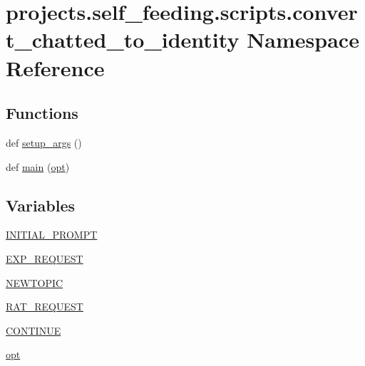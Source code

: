 \hypertarget{namespaceprojects_1_1self__feeding_1_1scripts_1_1convert__chatted__to__identity}{}\section{projects.\+self\+\_\+feeding.\+scripts.\+convert\+\_\+chatted\+\_\+to\+\_\+identity Namespace Reference}
\label{namespaceprojects_1_1self__feeding_1_1scripts_1_1convert__chatted__to__identity}
\subsection*{Functions}
\begin{DoxyCompactItemize}
\item 
def \hyperlink{namespaceprojects_1_1self__feeding_1_1scripts_1_1convert__chatted__to__identity_a2179caf1a41e96bb38cad058863084a3}{setup\+\_\+args} ()
\item 
def \hyperlink{namespaceprojects_1_1self__feeding_1_1scripts_1_1convert__chatted__to__identity_ac409d1c26364c39762dd2357afdaf64a}{main} (\hyperlink{namespaceprojects_1_1self__feeding_1_1scripts_1_1convert__chatted__to__identity_a20c8e6a1edf5dd1186afbb0f961f288f}{opt})
\end{DoxyCompactItemize}
\subsection*{Variables}
\begin{DoxyCompactItemize}
\item 
\hyperlink{namespaceprojects_1_1self__feeding_1_1scripts_1_1convert__chatted__to__identity_a59ec78cd0ffcde2e03b3d3c052e57451}{I\+N\+I\+T\+I\+A\+L\+\_\+\+P\+R\+O\+M\+PT}
\item 
\hyperlink{namespaceprojects_1_1self__feeding_1_1scripts_1_1convert__chatted__to__identity_a2273b0a6ff3e82c4ac1d94a7f03e43ee}{E\+X\+P\+\_\+\+R\+E\+Q\+U\+E\+ST}
\item 
\hyperlink{namespaceprojects_1_1self__feeding_1_1scripts_1_1convert__chatted__to__identity_a89d61bd2a5fa557367d63e513fcef1c6}{N\+E\+W\+T\+O\+P\+IC}
\item 
\hyperlink{namespaceprojects_1_1self__feeding_1_1scripts_1_1convert__chatted__to__identity_a9c4f3ab0ab792875644a8bfabe23a5da}{R\+A\+T\+\_\+\+R\+E\+Q\+U\+E\+ST}
\item 
\hyperlink{namespaceprojects_1_1self__feeding_1_1scripts_1_1convert__chatted__to__identity_ac5c576d4b9952271c65abdbfab742c53}{C\+O\+N\+T\+I\+N\+UE}
\item 
\hyperlink{namespaceprojects_1_1self__feeding_1_1scripts_1_1convert__chatted__to__identity_a20c8e6a1edf5dd1186afbb0f961f288f}{opt}
\end{DoxyCompactItemize}


